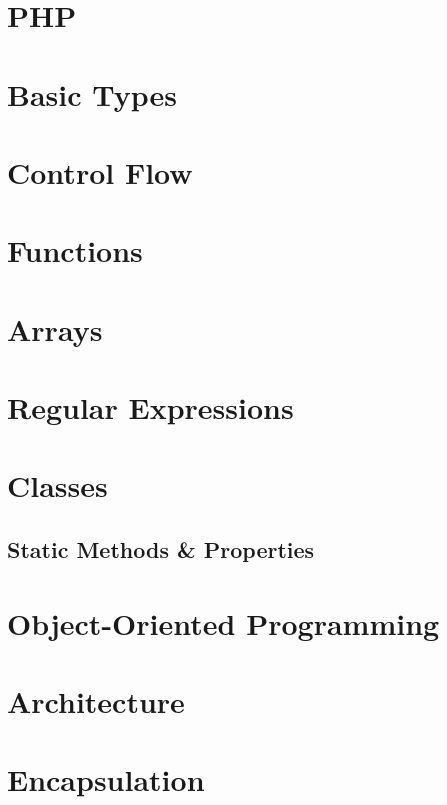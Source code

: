 \documentclass[b5paper,openany]{book}
\begin{document}
\tp


\tableofcontents



\chapter{PHP}


\chapter{Basic Types}


\chapter{Control Flow}


\chapter{Functions}


\chapter{Arrays}


\chapter{Regular Expressions}


\chapter{Classes}


\begin{readonly}
    \chapter{Static Methods \& Properties}
    
\end{readonly}

\chapter{Object-Oriented Programming}


\chapter{Architecture}


\chapter{Encapsulation}







\end{document}
